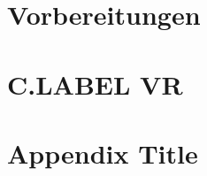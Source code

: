 \documentclass[12pt]{scrreprt}
\begin{document}
\chapter{Vorbereitungen}


\chapter{C.LABEL VR}




%


\appendix
\chapter{Appendix Title}
%





\end{document}

